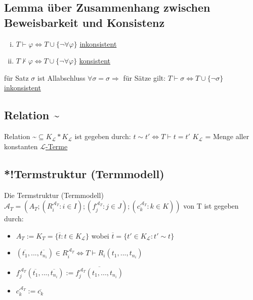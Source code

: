 \documentclass[12pt,a4paper]{article} %
\begin{document}
	\subsection[LBK]{Lemma über Zusammenhang zwischen Beweisbarkeit und Konsistenz}
	\begin{enumerate}[(i)]
		\item $T \hyperref[Beweisbar]{\vdash} \varphi \Leftrightarrow T \cup \{\neg \forall \varphi\}$ \hyperref[PLKonsistent]{inkonsistent}
		\item $T \nvdash \varphi \Leftrightarrow T \cup \{\neg \forall \varphi\}$ \hyperref[PLKonsistent]{konsistent}
	\end{enumerate}
	für Satz $\sigma$ ist Allabschluss $\forall \sigma = \sigma \Rightarrow$ für Sätze gilt: $T \hyperref[Beweisbar]{\vdash} \sigma \Leftrightarrow T \cup \{\neg \sigma\}$ \hyperref[PLKonsistent]{inkonsistent}
	
	\subsection{Relation \textasciitilde}
	Relation \textasciitilde $\subseteq K_{\mathcal{L}} * K_{\mathcal{L}}$ ist gegeben durch: $ t \sim t' \Leftrightarrow T \hyperref[Beweisbar]{\vdash} t = t'$ \newline
	$K_{\mathcal{L}}$ = Menge aller konstanten \hyperref[Term]{$\mathcal{L}$-Terme}
	
	\subsection{*!Termstruktur (Termmodell)}
	Die Termstruktur (Termmodell) $\mathcal{A}_T = (A_T; (R_i^{\mathcal{A}_T}: i \in I); (f_j^{\mathcal{A}_T}: j \in J); (c_k^{\mathcal{A}_T}: k \in K))$ von T ist gegeben durch: 
	\begin{itemize}
		\item $A_T := K_T = \{\overline{t}: t \in K_{\mathcal{L}}\}$ wobei $\overline{t} = \{t' \in K_{\mathcal{L}}: t' \sim t\}$
		\item $(\overline{t_1}, ..., \overline{t_{n_i}}) \in R_i^{\mathcal{A}_T} \Leftrightarrow T \hyperref[Beweisbar]{\vdash} R_i(t_1, ..., t_{n_i})$
		\item $f_j^{\mathcal{A}_T}(\overline{t_1}, ..., \overline{t_{n_i}}) := \overline{f_j^{\mathcal{A}_T}(t_1, ..., t_{n_i})}$
		\item $c_k^{\mathcal{A}_T} := \overline{c_k}$
	\end{itemize}
\end{document}
